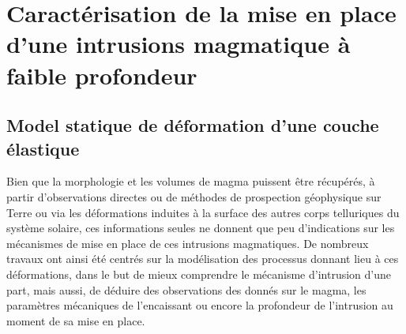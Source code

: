 \section{Caractérisation  de   la  mise  en  place   d'une  intrusions
  magmatique à faible profondeur}
\label{sec:orign-theor-fram}

\subsection{Model statique de déformation d'une couche élastique}
\label{sec:model-statique-de}

Bien  que  la  morphologie  et  les volumes  de  magma  puissent  être
récupérés,  à  partir  d'observations   directes  ou  de  méthodes  de
prospection géophysique sur  Terre ou via les  déformations induites à
la  surface  des autres  corps  telluriques  du système  solaire,  ces
informations  seules   ne  donnent  que  peu   d'indications  sur  les
mécanismes  de  mise  en  place de  ces  intrusions  magmatiques.   De
nombreux  travaux  ont  ainsi  été centrés  sur  la  modélisation  des
processus  donnant lieu  à  ces  déformations, dans  le  but de  mieux
comprendre le mécanisme d'intrusion d'une part, mais aussi, de déduire
des observations des donnés sur le magma, les paramètres mécaniques de
l'encaissant ou  encore la profondeur  de l'intrusion au moment  de sa
mise en place.

